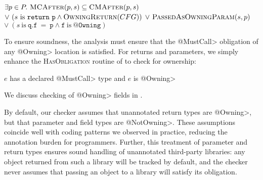 \begin{algorithmic}
  \State \Return $\exists p \in P .\ \textsc{MCAfter}(p,s) \subseteq \textsc{CMAfter}(p,s)$ \newline
  \hspace*{6em} $\vee\ (s \mathrm{\ is\ } \mathtt{return\ p} \wedge \textsc{OwningReturn}(CFG))$ \newline
  \hspace*{6em} $\vee\ \textsc{PassedAsOwningParam}(s,p)$\newline
  \hspace*{6em} $\vee\ (s \mathrm{\ is\ } \mathtt{q.f\ =\ p} \wedge \mathtt{f} \mathrm{\ is\ } \mathtt{@Owning})$
  \EndProcedure

\end{algorithmic}

To ensure soundness, the analysis must ensure that the \<@MustCall> obligation
of any \<@Owning> location is satisfied.  For returns and parameters, we simply
enhance the \textsc{HasObligation} routine of  to check for
ownership:
\begin{algorithmic}
  \State \Return $e$ has a declared \<@MustCall> type and $e$ is \<@Owning>
  \EndProcedure
\end{algorithmic}
We discuss checking of \<@Owning> fields in .  

By default, our checker assumes that unannotated return types are \<@Owning>,
but that parameter and field types are \<@NotOwning>.  These assumptions
coincide well with coding patterns we observed in practice, reducing the
annotation burden for programmers.  Further, this treatment of parameter and
return types ensures sound handling of unannotated third-party libraries: any
object returned from such a library will be tracked by default, and the checker
never assumes that passing an object to a library will satisfy its obligation.

